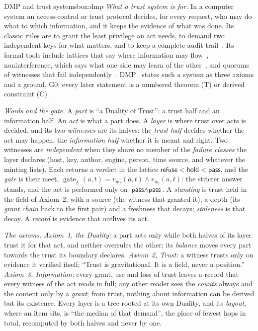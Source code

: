 \begin{primer}{DMP and trust systems}{box:dmp}
\setlength{\parskip}{3pt plus 1pt}%
\emph{What a trust system is for.} In a computer system an access-control or trust protocol decides, for every request, who may do what
to which information, and it keeps the evidence of what was done. Its classic rules are to grant the least privilege an act needs, to
demand two independent keys for what matters, and to keep a complete audit trail~\cite{saltzer1975}. Its formal tools include lattices
that say where information may flow~\cite{denning}, noninterference, which says what one side may learn of the other~\cite{gm}, and quorums
of witnesses that fail independently~\cite{mr}. DMP~\cite{dmp} states such a system as three axioms and a ground, G0; every later
statement is a numbered theorem (T) or derived constraint (C).

\emph{Words and the gate.} A \emph{part} is ``a Duality of Trust'': a trust half and an information half. An \emph{act} is what a part
does. A \emph{layer} is where trust over acts is decided, and its two \emph{witnesses} are its halves: the \emph{trust half} decides whether
the act may happen, the \emph{information half} whether it is meant and right. Two witnesses are \emph{independent} when they share no
member of the \emph{failure classes} the layer declares (host, key, author, engine, person, time source, and whatever the minting lists).
Each returns a verdict in the lattice $\textsf{refuse}<\textsf{hold}<\textsf{pass}$, and the \emph{gate} is their meet,
$\operatorname{gate}_L(a,t)=v_{w_T}(a,t)\wedge v_{w_I}(a,t)$: the stricter answer stands, and the act is performed only on
$\textsf{pass}\wedge\textsf{pass}$. A \emph{standing} is trust held in the field of Axiom~2, with a source (the witness that granted it), a
depth (its \emph{grant chain} back to the first pair) and a freshness that decays; \emph{staleness} is that decay. A \emph{record} is
evidence that outlives its act.

\emph{The axioms.} \emph{Axiom~1, the Duality:} a part acts only while both halves of its layer trust it for that act, and neither
overrules the other; its \emph{balance} moves every part towards the trust its boundary declares. \emph{Axiom~2, Trust:} a witness trusts
only on evidence it verified itself; ``Trust is gravitational. It is a field, never a position.'' \emph{Axiom~3, Information:} every grant,
use and loss of trust leaves a record that every witness of the act reads in full; any other reader sees the \emph{counts} always and the
content only by a \emph{grant}; from trust, nothing about information can be derived but its existence. Every layer is a tree rooted at
its own Duality, and its \emph{layout}, where an item sits, is ``the median of that demand'', the place of fewest hops in total,
recomputed by both halves and never by one.


\end{primer}
